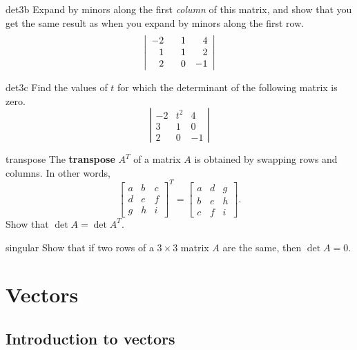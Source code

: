 \documentclass[prettycode,shellescape]{watsonbook}
\begin{document}
\begin{exercise}{}{det3b}
  Expand by minors along the first \textit{column} of this matrix, and
  show that you get the same result as when you expand by minors along
  the first row.
  \[
    \left|
      \begin{array}{ccc} -2 & \hphantom{-}1 & \hphantom{-}4 \\
        \hphantom{-}1 & \hphantom{-}1 & \hphantom{-}2 \\ \hphantom{-}2
                            & \hphantom{-}0 & -1
      \end{array}
    \right|
  \]
\end{exercise}

\begin{exercise}{}{det3c}
  Find the values of $t$ for which the determinant of the following matrix is zero.  
  \[
    \left|\begin{array}{ccc} -2 & t^2 & 4 \\  3 & 1 & 0 \\ 2 & 0  & -1 \end{array}\right|
  \]
\end{exercise}

\begin{exercise}{}{transpose}
  The \textbf{transpose} $A^T$ of a matrix $A$ is obtained by swapping rows and
  columns. In other words,
  \[
    \left[
      \begin{array}{ccc} a & b & c
        \\ d & e & f
        \\ g & h &i
      \end{array}
    \right]^T
    =
    \left[
      \begin{array}{ccc}
        a & d & g\\ b & e & h \\ c & f & i
      \end{array}
    \right]. 
  \]
  Show  that $\det A = \det A^T$. 
\end{exercise}

\begin{exercise}{}{singular}
  Show that if two rows of a $3 \times 3$ matrix $A$ are the same,
  then $\det A = 0$. 
\end{exercise}

\chapter{Vectors}

\section{Introduction to vectors} \label{sec:vectors} 
\end{document}
